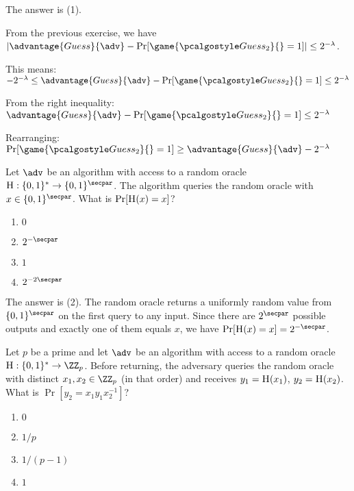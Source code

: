\ifsolutions
\begin{mysolution}
  The answer is (1).
  
  From the previous exercise, we have $|\advantage{Guess}{\adv} - \Pr[\game{\algo{Guess}_2}{} = 1]| \leq 2^{-\lambda}$.
  
  This means:
  $-2^{-\lambda} \leq \advantage{Guess}{\adv} - \Pr[\game{\algo{Guess}_2}{} = 1] \leq 2^{-\lambda}$
  
  From the right inequality:
  $\advantage{Guess}{\adv} - \Pr[\game{\algo{Guess}_2}{} = 1] \leq 2^{-\lambda}$
  
  Rearranging:
  $\Pr[\game{\algo{Guess}_2}{} = 1] \geq \advantage{Guess}{\adv} - 2^{-\lambda}$
\end{mysolution}
\fi

\begin{exercise}
  Let $\adv$ be an algorithm with access to a random oracle $\pcoracle{H}: \{0,1\}^* \to \{0,1\}^\secpar$.
  The algorithm queries the random oracle with $x \in \{0,1\}^\secpar$.
  What is $\Pr[{\normalfont\textsc{H}}(x) = x]$?
  \begin{enumerate}
    \item $0$
    \item $2^{-\secpar}$
    \item $1$
    \item $2^{-2\secpar}$
  \end{enumerate}
\end{exercise}

\ifsolutions
\begin{mysolution}
  The answer is (2).
  The random oracle returns a uniformly random value from $\{0,1\}^\secpar$ on the first query to any input.
  Since there are $2^\secpar$ possible outputs and exactly one of them equals $x$, we have $\Pr[\pcoracle{H}(x) = x] = 2^{-\secpar}$.
\end{mysolution}
\fi

\begin{exercise}
  Let $p$ be a prime and let $\adv$ be an algorithm with access to a random oracle $\pcoracle{H}: \{0,1\}^* \to \ZZ_p$.
  Before returning, the adversary queries the random oracle with distinct $x_1, x_2 \in \ZZ_p$ (in that order) and receives $y_1 = {\normalfont\textsc{H}}(x_1)$, $y_2 = {\normalfont\textsc{H}}(x_2)$.
  What is $\Pr[y_2 = x_1 y_1 x_2^{-1}]$?
  \begin{enumerate}
    \item $0$
    \item $1/p$
    \item $1/(p-1)$
    \item $1$
  \end{enumerate}
\end{exercise}

